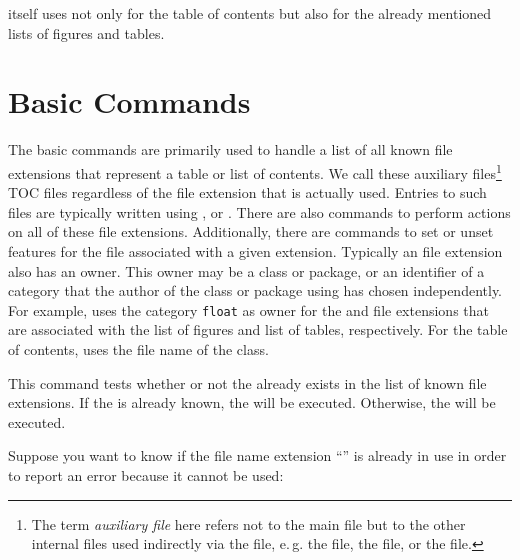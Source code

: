 \KOMAScript{} itself uses  not only for the table of
contents but also for the already mentioned lists of figures and tables.

\section{Basic Commands}

The basic commands are primarily used to handle a list of all known file
extensions that represent a table or
list of contents. We call these auxiliary files\footnote{The term \emph{auxiliary file} here refers not to the main
   file but to the other internal files used indirectly via the
   file, e.\,g. the  file, the  file, or the
   file.} TOC files
regardless of the file extension that is actually used. Entries to such files
are typically written using
, or
. There are also commands to perform
actions on all of these file extensions. Additionally, there are commands to
set or unset features for the file associated with a given extension.
Typically an file extension also has an owner. This owner
may be a class or package, or an identifier of a category that the author of
the class or package using  has chosen independently. For
example, \KOMAScript{} uses the category \texttt{float} as owner for the
 and  file extensions that are associated with the list of
figures and list of tables, respectively. For the table of contents,
\KOMAScript{} uses the file name of the class.

\begin{Declaration}
\end{Declaration}
This command tests whether or not the
 already exists in the list of known file extensions. If the
 is already known, the  will be
executed. Otherwise, the  will be executed.
\begin{Example}
  Suppose you want to know if the file name extension ``'' is
  already in use in order to report an error because it cannot be used:
\begin{lstcode}
\end{lstcode}
\end{Example}
\EndIndexGroup


